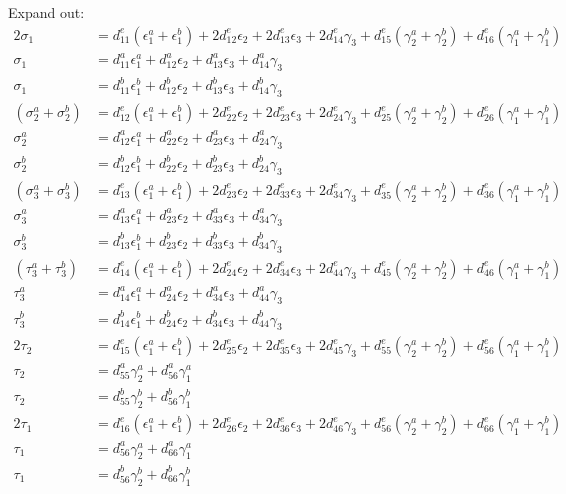 \documentclass{article}
\begin{document}
Expand out:
\begin{subequations}
\begin{align}
2\sigma_1 & = d_{11}^e(\epsilon_1^a+\epsilon_1^b) + 2d_{12}^e\epsilon_2 + 2d_{13}^e\epsilon_3 + 2d_{14}^e\gamma_3 + d_{15}^e(\gamma_2^a+\gamma_2^b) + d_{16}^e(\gamma_1^a+\gamma_1^b)\\
\sigma_1 & = d_{11}^a\epsilon_1^a + d_{12}^a\epsilon_2 + d_{13}^a\epsilon_3 + d_{14}^a\gamma_3 \\ 
\sigma_1 & = d_{11}^b\epsilon_1^b + d_{12}^b\epsilon_2 + d_{13}^b\epsilon_3 + d_{14}^b\gamma_3 \\
(\sigma_2^a+\sigma_2^b) & = d_{12}^e(\epsilon_1^a+\epsilon_1^b) + 2d_{22}^e\epsilon_2 + 2d_{23}^e\epsilon_3 + 2d_{24}^e\gamma_3 + d_{25}^e(\gamma_2^a+\gamma_2^b) + d_{26}^e(\gamma_1^a+\gamma_1^b)\\
\sigma_2^a & = d_{12}^a\epsilon_1^a + d_{22}^a\epsilon_2 + d_{23}^a\epsilon_3 + d_{24}^a\gamma_3 \\ 
\sigma_2^b & = d_{12}^b\epsilon_1^b + d_{22}^b\epsilon_2 + d_{23}^b\epsilon_3 + d_{24}^b\gamma_3 \\
(\sigma_3^a+\sigma_3^b) & = d_{13}^e(\epsilon_1^a+\epsilon_1^b) + 2d_{23}^e\epsilon_2 + 2d_{33}^e\epsilon_3 + 2d_{34}^e\gamma_3 + d_{35}^e(\gamma_2^a+\gamma_2^b) + d_{36}^e(\gamma_1^a+\gamma_1^b)\\
\sigma_3^a & = d_{13}^a\epsilon_1^a + d_{23}^a\epsilon_2 + d_{33}^a\epsilon_3 + d_{34}^a\gamma_3 \\ 
\sigma_3^b & = d_{13}^b\epsilon_1^b + d_{23}^b\epsilon_2 + d_{33}^b\epsilon_3 + d_{34}^b\gamma_3 \\
(\tau_3^a+\tau_3^b) & = d_{14}^e(\epsilon_1^a+\epsilon_1^b) + 2d_{24}^e\epsilon_2 + 2d_{34}^e\epsilon_3 + 2d_{44}^e\gamma_3 + d_{45}^e(\gamma_2^a+\gamma_2^b) + d_{46}^e(\gamma_1^a+\gamma_1^b)\\
\tau_3^a & = d_{14}^a\epsilon_1^a + d_{24}^a\epsilon_2 + d_{34}^a\epsilon_3 + d_{44}^a\gamma_3 \\ 
\tau_3^b & = d_{14}^b\epsilon_1^b + d_{24}^b\epsilon_2 + d_{34}^b\epsilon_3 + d_{44}^b\gamma_3 \\
2\tau_2 & = d_{15}^e(\epsilon_1^a+\epsilon_1^b) + 2d_{25}^e\epsilon_2 + 2d_{35}^e\epsilon_3 + 2d_{45}^e\gamma_3 + d_{55}^e(\gamma_2^a+\gamma_2^b) + d_{56}^e(\gamma_1^a+\gamma_1^b)\\
\tau_2 & = d_{55}^a\gamma_2^a + d_{56}^a\gamma_1^a \\ 
\tau_2 & = d_{55}^b\gamma_2^b + d_{56}^b\gamma_1^b \\
2\tau_1 & = d_{16}^e(\epsilon_1^a+\epsilon_1^b) + 2d_{26}^e\epsilon_2 + 2d_{36}^e\epsilon_3 + 2d_{46}^e\gamma_3 + d_{56}^e(\gamma_2^a+\gamma_2^b) + d_{66}^e(\gamma_1^a+\gamma_1^b)\\
\tau_1 & = d_{56}^a\gamma_2^a + d_{66}^a\gamma_1^a \\ 
\tau_1 & = d_{56}^b\gamma_2^b + d_{66}^b\gamma_1^b \\
\end{align}
\label{expand}
\end{subequations}
\end{document}
